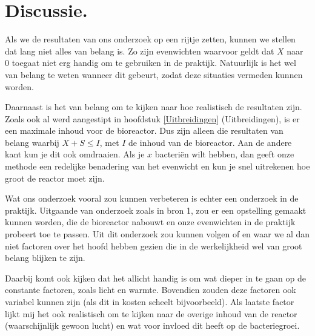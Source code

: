 
\chapter{Discussie.}
\label{Discussie}
Als we de resultaten van ons onderzoek op een rijtje zetten, kunnen we stellen dat lang niet alles van belang is. Zo zijn evenwichten waarvoor geldt dat $X$ naar 0 toegaat niet erg handig om te gebruiken in de praktijk. Natuurlijk is het wel van belang te weten wanneer dit gebeurt, zodat deze situaties vermeden kunnen worden. 

Daarnaast is het van belang om te kijken naar hoe realistisch de resultaten zijn. Zoals ook al werd aangestipt in hoofdstuk \ref{Uitbreidingen} (Uitbreidingen), is er een maximale inhoud voor de bioreactor. Dus zijn alleen die resultaten van belang waarbij $X + S \leq I$, met $I$ de inhoud van de bioreactor. Aan de andere kant kun je dit ook omdraaien. Als je $x$ bacteri\"en wilt hebben, dan geeft onze methode een redelijke benadering van het evenwicht en kun je snel uitrekenen hoe groot de reactor moet zijn.

Wat ons onderzoek vooral zou kunnen verbeteren is echter een onderzoek in de praktijk. Uitgaande van onderzoek zoals in bron 1, zou er een opstelling gemaakt kunnen worden, die de bioreactor nabouwt en onze evenwichten in de praktijk probeert toe te passen. Uit dit onderzoek zou kunnen volgen of en waar we al dan niet factoren over het hoofd hebben gezien die in de werkelijkheid wel van groot belang blijken te zijn. 

Daarbij komt ook kijken dat het allicht handig is om wat dieper in te gaan op de constante factoren, zoals licht en warmte. Bovendien zouden deze factoren ook variabel kunnen zijn (als dit in kosten scheelt bijvoorbeeld). Als laatste factor lijkt mij het ook realistisch om te kijken naar de overige inhoud van de reactor (waarschijnlijk gewoon lucht) en wat voor invloed dit heeft op de bacteriegroei. 

